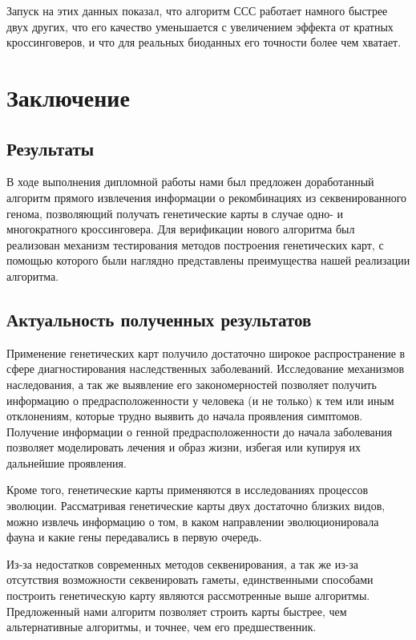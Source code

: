 \documentclass{matmex-diploma-custom}
\begin{document}

Запуск на этих данных показал, что алгоритм ССС работает намного
быстрее двух других, что его качество уменьшается с увеличением
эффекта от кратных кроссинговеров, и что для реальных биоданных его
точности более чем хватает.


\section*{Заключение}

\subsection*{Результаты}

В ходе выполнения дипломной работы нами был предложен доработанный
алгоритм прямого извлечения информации о рекомбинациях из
секвенированного генома, позволяющий получать генетические карты в
случае одно- и многократного кроссинговера.  Для верификации нового
алгоритма был реализован механизм тестирования методов построения
генетических карт, с помощью которого были наглядно представлены
преимущества нашей реализации алгоритма.

\subsection*{Актуальность полученных результатов}

Применение генетических карт получило достаточно широкое
распространение в сфере диагностирования наследственных
заболеваний. Исследование механизмов наследования, а так же выявление
его закономерностей позволяет получить информацию о
предрасположенности у человека (и не только) к тем или иным
отклонениям, которые трудно выявить до начала проявления
симптомов. Получение информации о генной предрасположенности до начала
заболевания позволяет моделировать лечения и образ жизни, избегая или
купируя их дальнейшие проявления.

Кроме того, генетические карты применяются в исследованиях процессов
эволюции. Рассматривая генетические карты двух достаточно близких
видов, можно извлечь информацию о том, в каком направлении
эволюционировала фауна и какие гены передавались в первую очередь.

Из-за недостатков современных методов секвенирования, а так же из-за
отсутствия возможности секвенировать гаметы, единственными способами
построить генетическую карту являются рассмотренные выше
алгоритмы. Предложенный нами алгоритм позволяет строить карты быстрее,
чем альтернативные алгоритмы, и точнее, чем его предшественник.

\clearpage
{}


\end{document}
